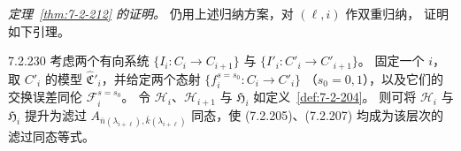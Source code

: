
\par\noindent\textit{定理~\ref{thm:7-2-212} 的证明。}
仍用上述归纳方案，对 $(\ell,i)$ 作双重归纳，
证明如下引理。

\begin{lemma}{7.2.230}\label{lem:7-2-230}
考虑两个有向系统
$\{I_i\colon C_i\to C_{i+1}\}$ 与
$\{I'_i\colon C'_i\to C'_{i+1}\}$。
固定一个 $i$，取 $C'_i$ 的模型
$\widehat{\mathfrak C}'_i$，并给定两个态射
$\{f_i^{s=s_0}\colon C_i\to C'_i\}$
（$s_0=0,1$），以及它们的交换误差同伦
$\mathcal F_i^{s=s_0}$。
令 $\mathcal H_i$、$\mathcal H_{i+1}$ 与
$\mathfrak H_i$ 如定义~\ref{def:7-2-204}。
则可将 $\mathcal H_i$ 与 $\mathfrak H_i$
提升为滤过
$A_{\bar n(\lambda_{i+\ell}),\bar k(\lambda_{i+\ell})}$
同态，使 (7.2.205)、(7.2.207)
均成为该层次的滤过同态等式。
\end{lemma}

